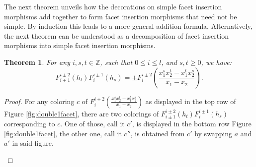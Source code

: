 \documentclass[12pt]{amsart}
\newtheorem{theorem}{Theorem}[section]
\theoremstyle{definition}
\theoremstyle{remark}
\numberwithin{equation}{section}
\numberwithin{figure}{section}
\newcommand{\Z}{\mathbb{Z}}
\begin{document}
The next theorem unveils how the decorations on simple facet insertion morphisms add together to form facet insertion morphisms that need not be simple. By induction this leads to a more general addition formula. Alternatively, the next theorem can be understood as a decomposition of facet insertion morphisms into simple facet insertion morphisms.
\begin{theorem}\label{thm:composition of slice morphisms}
  For any $i,s,t \in \Z$, such that  $0\leq i\leq l$, and $s,t \geq 0$, we have:
  \begin{equation}
    F^{i\pm 2}_{i\pm 1}(h_t)F^{i\pm 1}_{i}(h_s)=\pm F^{i\pm 2}_{i}(\frac{x_1^sx_2^t-x_1^tx_2^s}{x_1-x_2}).
    \label{DifferentialFormulaOne}
  \end{equation}
\end{theorem}
\begin{proof}
For any coloring $c$ of $F_i^{i+2}(\frac{x_1^sx_2^t-x_1^tx_2^s}{x_1-x_2})$ as displayed in the top row of Figure \ref{fig:double1facet}, there are two colorings of $F^{i\pm 2}_{i\pm 1}(h_t)F^{i\pm 1}_{i}(h_s)$ corresponding to $c$. One of those, call it $c'$, is displayed in the bottom row Figure \ref{fig:double1facet}, the other one, call it $c''$, is obtained from $c'$ by swapping $a$ and $a'$ in said figure. 
  \begin{figure}[htbp]
    \centering 
\end{figure}
\end{proof}
\end{document}
